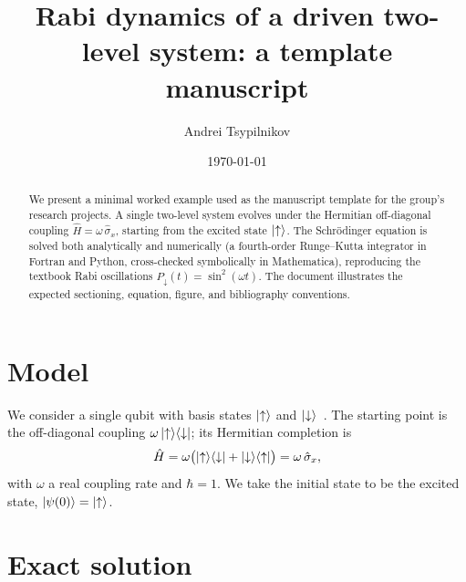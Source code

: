 \documentclass[aps,pra,reprint,amsmath,amssymb,floatfix]{revtex4-2}
\begin{document}
\title{Rabi dynamics of a driven two-level system: a template manuscript}

\author{Andrei Tsypilnikov}

\date{\today}

\begin{abstract}
We present a minimal worked example used as the manuscript template for the
group's research projects. A single two-level system evolves under the
Hermitian off-diagonal coupling $\hat H = \omega\,\hat\sigma_x$, starting from
the excited state $\ket{\uparrow}$. The Schr\"odinger equation is solved both
analytically and numerically (a fourth-order Runge--Kutta integrator in
Fortran and Python, cross-checked symbolically in Mathematica), reproducing
the textbook Rabi oscillations $P_\downarrow(t)=\sin^2(\omega t)$. The document
illustrates the expected sectioning, equation, figure, and bibliography
conventions.
\end{abstract}

\maketitle

\section{Model}
\label{sec:model}

We consider a single qubit with basis states $\ket{\uparrow}$ and
$\ket{\downarrow}$~\cite{Sakurai2017, NielsenChuang2010}. The starting point is the off-diagonal coupling
$\omega\ket{\uparrow}\!\bra{\downarrow}$; its Hermitian completion is
\begin{equation}
  \hat H = \omega\bigl(\ket{\uparrow}\!\bra{\downarrow}
        + \ket{\downarrow}\!\bra{\uparrow}\bigr)
        = \omega\,\hat\sigma_x ,
  \label{eq:hamiltonian}
\end{equation}
with $\omega$ a real coupling rate and $\hbar = 1$. We take the initial state
to be the excited state, $\ket{\psi(0)} = \ket{\uparrow}$.

\section{Exact solution}
\label{sec:exact}
\end{document}
